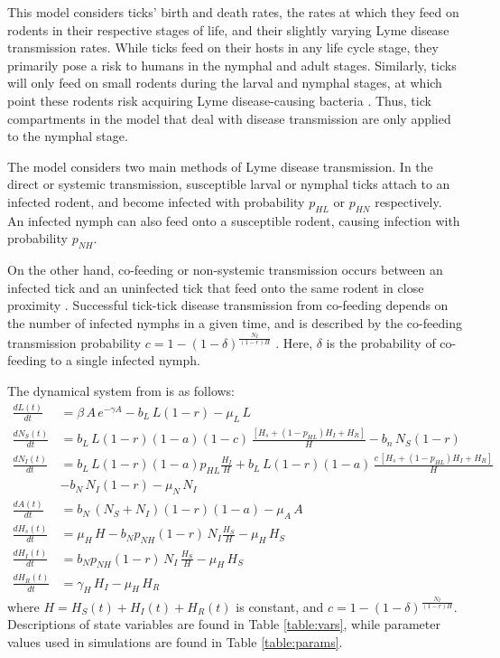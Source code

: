 \documentclass[12pt, centerh1]{article}
\begin{document}
This model considers ticks' birth and death rates, the rates at which they feed on rodents in their respective stages of life, and their slightly varying Lyme disease transmission rates. While ticks feed on their hosts in any life cycle stage, they primarily pose a risk to humans in the nymphal and adult stages. Similarly, ticks will only feed on small rodents during the larval and nymphal stages, at which point these rodents risk acquiring Lyme disease-causing bacteria \citep{borrelia_shapiro}. Thus, tick compartments in the model that deal with disease transmission are only applied to the nymphal stage.

The model considers two main methods of Lyme disease transmission. In the direct or systemic transmission, susceptible larval or nymphal ticks attach to an infected rodent, and become infected with probability $p_{HL}$ or $p_{HN}$ respectively. An infected nymph can also feed onto a susceptible rodent, causing infection with probability $p_{NH}$.

On the other hand, co-feeding or non-systemic transmission occurs between an infected tick and an uninfected tick that feed onto the same rodent in close proximity \citep{voordouw2015co}. Successful tick-tick disease transmission from co-feeding depends on the number of infected nymphs in a given time, and is described by the co-feeding transmission probability $\displaystyle c = 1 - (1-\delta)^{\frac{N_I}{(1-r)H}}$ \citep{tosato2021host,nah2019assessing}. Here, $\delta$ is the probability of co-feeding to a single infected nymph.


The dynamical system from \citet{tosato2021host} is as follows:
\begin{align*}
    \frac{dL(t)}{dt} &= \beta \,A \, e^{-\gamma A} - b_L \,L (1-r) - \mu_L \,L \\
    \frac{dN_S(t)}{dt} &= b_L\,L(1-r)(1-a)(1-c) \, \frac{[H_s + (1- p_{HL})H_I + H_R]}{H} - b_n\,N_S (1-r) \\ 
    \frac{dN_I(t)}{dt} &= b_L \,L(1-r) (1-a) p_{HL} \frac{H_I}{H} + b_L \,L(1-r)(1-a)\,\frac{c \,[H_s + (1- p_{HL})H_I + H_R]}{H} \\
    &- b_N\, N_I (1-r) - \mu_N \,N_I\\
    \frac{dA(t)}{dt} &= b_N \,(N_S + N_I) (1-r) (1-a) - \mu_A \,A \\
    \frac{dH_s(t)}{dt} &= \mu_H \,H - b_N p_{NH}(1-r) \,N_I \frac{H_S}{H} - \mu_H \, H_S\\
    \frac{dH_I(t)}{dt} &= b_N p_{NH} (1-r)\, N_I \,\frac{H_S}{H} - \mu_H \, H_S \\
    \frac{dH_R(t)}{dt} &= \gamma_H \, H_I - \mu_H \, H_R
\end{align*}
where $H = H_S(t) + H_I(t) + H_R(t)$ is constant, and $\displaystyle c = 1 - (1-\delta)^{\frac{N_I}{(1-r)H}}$. Descriptions of state variables are found in Table \ref{table:vars}, while parameter values used in simulations are found in Table \ref{table:params}.
\end{document}

